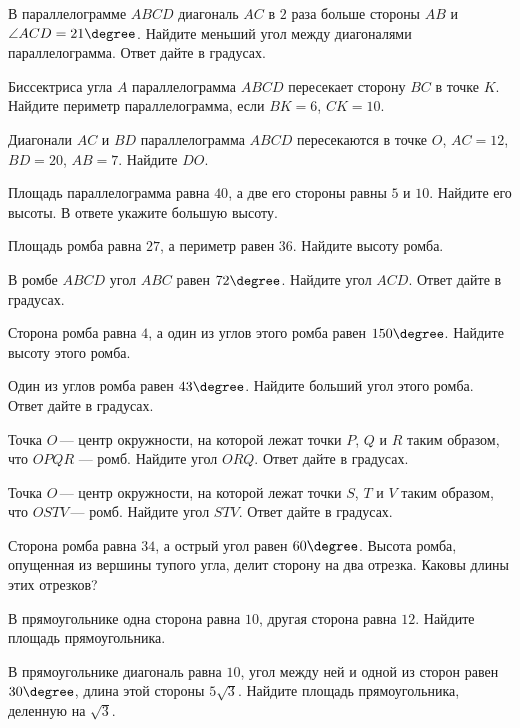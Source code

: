 \begin{class}[number=4]
	\begin{listofex}
		\item В параллелограмме \( ABCD \) диагональ \( AC \) в \( 2 \) раза больше стороны \( AB \) и \( \angle ACD=21\degree \). Найдите меньший угол между диагоналями параллелограмма. Ответ дайте в градусах.
		\item Биссектриса угла \( A \) параллелограмма \( ABCD \) пересекает сторону \( BC \) в точке \( K \). Найдите периметр параллелограмма, если \( BK=6 \), \( CK=10 \).
		\item Диагонали \( AC \) и \( BD \) параллелограмма \( ABCD \) пересекаются в точке \( O \), \( AC=12 \), \( BD=20 \), \( AB=7 \). Найдите \( DO \).
		\item Площадь параллелограмма равна \( 40 \), а две его стороны равны \( 5 \) и \( 10 \). Найдите его высоты. В ответе укажите большую высоту.
		\item Площадь ромба равна \( 27 \), а периметр равен \( 36 \). Найдите высоту ромба.
		\item В ромбе \( ABCD \) угол \( ABC \) равен \( 72\degree \). Найдите угол \( ACD \). Ответ дайте в градусах.
		\item Сторона ромба равна \( 4 \), а один из углов этого ромба равен \( 150\degree \). Найдите высоту этого ромба.
		\item Один из углов ромба равен \( 43\degree \). Найдите больший угол этого ромба. Ответ дайте в градусах.
		\item Точка \( O \) --- центр окружности, на которой лежат точки \( P \), \( Q \) и \( R \) таким образом, что \( OPQR \) --- ромб. Найдите угол \( ORQ \). Ответ дайте в градусах.
		\item Точка \( O \) --- центр окружности, на которой лежат точки \( S \), \( T \) и \( V \) таким образом, что \( OSTV \) --- ромб. Найдите угол \( STV \). Ответ дайте в градусах.
		\item Сторона ромба равна \( 34 \), а острый угол равен \( 60\degree \). Высота ромба, опущенная из вершины тупого угла, делит сторону на два отрезка. Каковы длины этих отрезков?
		\item В прямоугольнике одна сторона равна \( 10 \), другая сторона равна \( 12 \). Найдите площадь прямоугольника.
		\item В прямоугольнике диагональ равна \( 10 \), угол между ней и одной из сторон равен \( 30\degree \), длина этой стороны \( 5\sqrt{3} \). Найдите площадь прямоугольника, деленную на \( \sqrt{3} \).

\end{listofex}
\end{class}
